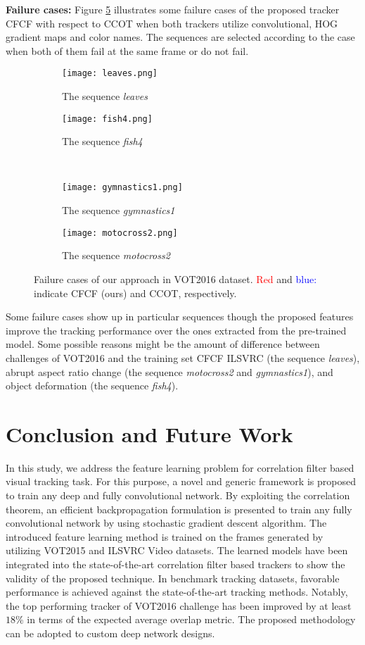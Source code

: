 \documentclass[journal]{IEEEtran}
\newcommand{\first}[1]{\textcolor{red}{#1}}
\newcommand{\second}[1]{\textcolor{blue}{#1}}
\begin{document}
\textbf{Failure cases:} Figure \ref{failureCases} illustrates some failure cases of the proposed tracker CFCF with respect to CCOT \cite{CCOT} when both trackers utilize convolutional, HOG gradient maps and color names. The sequences are selected according to the case when both of them fail at the same frame or do not fail.
\begin{figure}
\begin{subfigure}{.48\linewidth}
  \centering
  \texttt{[image: leaves.png]}
  \caption{The sequence \emph{leaves}}
  \label{Qual1}
\end{subfigure}\begin{subfigure}{.48\linewidth}
  \centering
  \texttt{[image: fish4.png]}
  \caption{The sequence \emph{fish4}}
  \label{Qual2}
\end{subfigure}
\\
\begin{subfigure}{.48\linewidth}
  \centering
  \texttt{[image: gymnastics1.png]}
  \caption{The sequence \emph{gymnastics1}}
  \label{Qual3}
\end{subfigure}\begin{subfigure}{.48\linewidth}
  \centering
  \texttt{[image: motocross2.png]}
  \caption{The sequence \emph{motocross2}}
  \label{Qual4}
\end{subfigure}
\caption{Failure cases of our approach in VOT2016 dataset. \first{Red} and \second{blue:} indicate CFCF (ours) and CCOT, respectively.}
\label{failureCases}
\end{figure}
Some failure cases show up in particular sequences though the proposed features improve the tracking performance over the ones extracted from the pre-trained model. Some possible reasons might be the amount of difference between challenges of VOT2016 and the training set CFCF ILSVRC (the sequence \emph{leaves}), abrupt aspect ratio change (the sequence \emph{motocross2} and \emph{gymnastics1}), and object deformation (the sequence \emph{fish4}).

\section{Conclusion and Future Work}
\label{secConclusion}
In this study, we address the feature learning problem for correlation filter based visual tracking task. For this purpose, a novel and generic framework is proposed to train any deep and fully convolutional network. By exploiting the correlation theorem, an efficient backpropagation formulation is presented to train any fully convolutional network by using stochastic gradient descent algorithm. The introduced feature learning method is trained on the frames generated by utilizing VOT2015 and ILSVRC Video datasets. The learned models have been integrated into the state-of-the-art correlation filter based trackers to show the validity of the proposed technique. In benchmark tracking datasets, favorable performance is achieved against the state-of-the-art tracking methods. Notably, the top performing tracker of VOT2016 challenge has been improved by at least $18$\% in terms of the expected average overlap metric. The proposed methodology can be adopted to custom deep network designs.
\appendices
\end{document}
